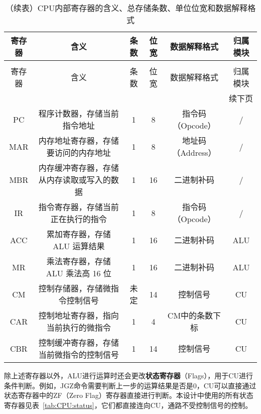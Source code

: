 \documentclass[lang=cn,a4paper,newtx]{elegantpaper}
\begin{document}
\begin{longtable}{c c c c c c}
  \caption{CPU内部寄存器的含义、总存储条数、单位位宽和数据解释格式} \label{tab:CPU:datawidth} \\
  \toprule
  寄存器 & 含义 & 条数 & 位宽 & 数据解释格式 & 归属模块\\
  \midrule
  \endfirsthead

  \caption[]{（续表）CPU内部寄存器的含义、总存储条数、单位位宽和数据解释格式} \\
  \toprule
  寄存器 & 含义 & 条数 & 位宽 & 数据解释格式 & 归属模块\\
  \midrule
  \endhead

  \midrule
  \multicolumn{6}{r}{续下页} \\
  \midrule
  \endfoot

  \bottomrule
  \endlastfoot

  PC   & 程序计数器，存储当前指令地址             & 1  & 8   & 指令码（Opcode） & /\\
  MAR  & 内存地址寄存器，存储要访问的内存地址     & 1  & 8   & 地址码（Address）& /\\
  MBR  & 内存缓冲寄存器，存储从内存读取或写入的数据 & 1  & 16  & 二进制补码 & /\\
  IR   & 指令寄存器，存储当前正在执行的指令       & 1  & 8   & 指令码（Opcode）& /\\
  ACC  & 累加寄存器，存储 ALU 运算结果           & 1  & 16  & 二进制补码 & ALU\\
  MR   & 乘法寄存器，存储 ALU 乘法高 16 位       & 1  & 16  & 二进制补码 & ALU\\
  CM   & 控制存储器，存储微指令控制信号         & 未定 & 14  & 控制信号 & CU\\
  CAR  & 控制地址寄存器，指向当前执行的微指令   & 1  & 4   & CM中的条数下标 & CU\\
  CBR  & 控制缓冲寄存器，存储当前微指令的控制信号 & 1  & 14  & 控制信号 & CU\\
\end{longtable}

除上述寄存器以外，ALU进行运算时还会更改\textbf{状态寄存器}（Flags），用于CU进行条件判断。例如，JGZ命令需要判断上一步的运算结果是否是0，CU可以直接通过状态寄存器中的ZF（Zero Flag）寄存器直接进行判断。本设计中使用的所有状态寄存器见表~\ref{tab:CPU:status}，它们都直接连向CU，通路不受控制信号的控制。
\end{document}
